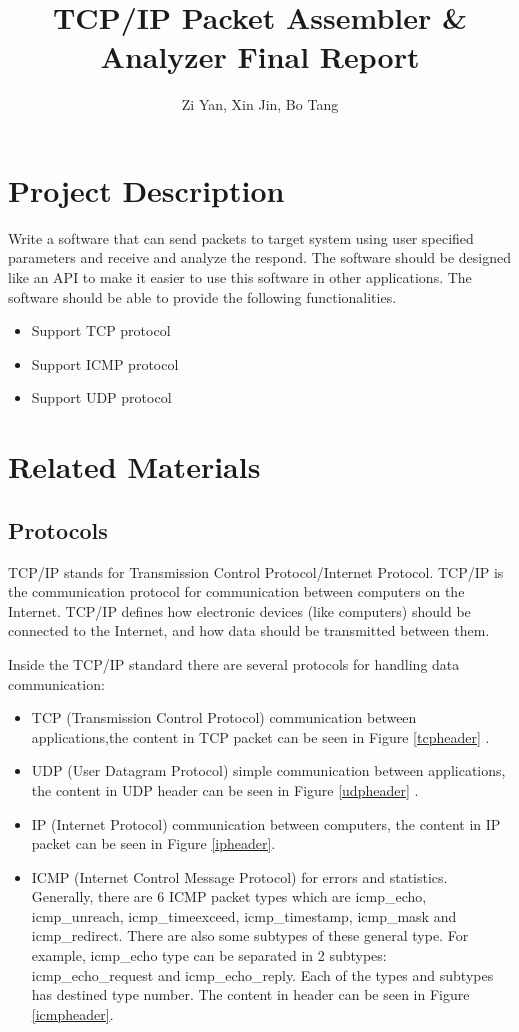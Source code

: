 \documentclass[12pt,letterpaper]{report}
\author{Zi Yan, Xin Jin, Bo Tang}
\title{TCP/IP Packet Assembler \& Analyzer Final Report}
\date{}
\begin{document}
\maketitle

\chapter*{Project Description}
Write a software that can send packets to target system using 
user specified parameters and receive and analyze the respond. 
The software should be designed like an API to make it easier 
to use this software in other applications. The software should 
be able to provide the following functionalities.

\begin{itemize}
 \item Support TCP protocol
 \item Support ICMP protocol
 \item Support UDP protocol
\end{itemize}

\chapter*{Related Materials}
\section*{Protocols}
TCP/IP stands for Transmission Control Protocol/Internet Protocol. 
TCP/IP is the communication protocol for communication between 
computers on the Internet. TCP/IP defines how electronic devices 
(like computers) should be connected to the Internet, and how 
data should be transmitted between them.

Inside the TCP/IP standard there are several protocols for 
handling data communication:

\begin{itemize}
 \item TCP (Transmission Control Protocol) communication between
  applications,the content in TCP packet can be seen in Figure \ref{tcpheader}
  \cite{1}. 
 \item UDP (User Datagram Protocol) simple communication between 
 applications, the content in UDP header can be seen in Figure \ref{udpheader}
 \cite{2}.
 \item IP (Internet Protocol) communication between computers, the content in IP packet can be seen in Figure \ref{ipheader}\cite{3}.
 \item ICMP (Internet Control Message Protocol) for errors and 
 statistics. Generally, there are 6 ICMP packet types which are 
 icmp\_echo, icmp\_unreach, icmp\_timeexceed, icmp\_timestamp, 
 icmp\_mask and icmp\_redirect. There are also some subtypes 
 of these general type. For example, icmp\_echo type can be 
 separated in 2 subtypes: icmp\_echo\_request and icmp\_echo\_reply. 
 Each of the types and subtypes has destined type number. 
 The content in header can be seen in Figure \ref{icmpheader}\cite{4}.
\end{itemize}
\end{document}
